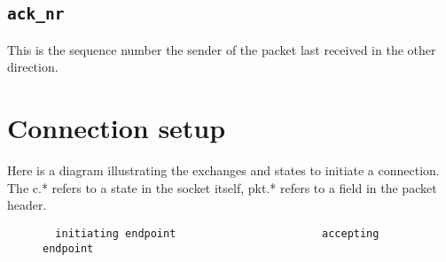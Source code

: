 \documentclass[11pt,a4paper,oneside,draft]{article}
\begin{document}
{\subsection {{\tt ack\_nr}}}

This is the sequence number the sender of the packet last received in the other direction.

{\section {Connection setup}}

Here is a diagram illustrating the exchanges and states to initiate a connection. The c.* refers to a state in the socket itself, pkt.* refers to a field in the packet header.

{\begin{figure}
{\begin{verbatim}
  initiating endpoint                       accepting endpoint


\end{verbatim}}
\end{figure}}
\end{document}
